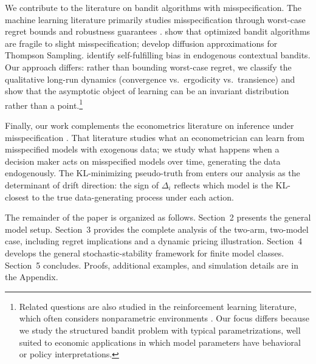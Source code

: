 \documentclass[12pt]{article}
\begin{document}
We contribute to the literature on bandit algorithms with misspecification. The machine learning literature primarily studies misspecification through worst-case regret bounds and robustness guarantees \citep{fosterAdaptingMisspecificationContextual2021,liModelMisspecificationReinforcementLearning2024}. \citet{fanFragilityOptimizedBandit2024} show that optimized bandit algorithms are fragile to slight misspecification; \citet{fanDiffusionApproximationsThompson2025} develop diffusion approximations for Thompson Sampling. \citet{liDynamicSelectionAlgorithmic2023} identify self-fulfilling bias in endogenous contextual bandits. Our approach differs: rather than bounding worst-case regret, we classify the qualitative long-run dynamics (convergence vs.\ ergodicity vs.\ transience) and show that the asymptotic object of learning can be an invariant distribution rather than a point.\footnote{Related questions are also studied in the reinforcement learning literature, which often considers nonparametric environments \citep{lattimoreLearningGoodFeature2020,bogunovicMisspecifiedGaussianProcess2021}. Our focus differs because we study the structured bandit problem with typical parametrizations, well suited to economic applications in which model parameters have behavioral or policy interpretations.}

Finally, our work complements the econometrics literature on inference under misspecification \citep{berkLimitingBehaviorPosterior1966,whiteMaximumLikelihoodEstimation1982,giacominiRobustBayesianInference2021a,bonhommeMinimizingSensitivityModel2022a,andrewsMisspecifiedMomentInequality2024a,mullerLocallyRobustEfficient2024,armstrongAdaptingMisspecification2025}. That literature studies what an econometrician can learn from misspecified models with exogenous data; we study what happens when a decision maker acts on misspecified models over time, generating the data endogenously. The KL-minimizing pseudo-truth from \citet{berkLimitingBehaviorPosterior1966} enters our analysis as the determinant of drift direction: the sign of $\Delta_i$ reflects which model is the KL-closest to the true data-generating process under each action.

The remainder of the paper is organized as follows. Section~2 presents the general model setup. Section~3 provides the complete analysis of the two-arm, two-model case, including regret implications and a dynamic pricing illustration. Section~4 develops the general stochastic-stability framework for finite model classes. Section~5 concludes. Proofs, additional examples, and simulation details are in the Appendix.
\end{document}
